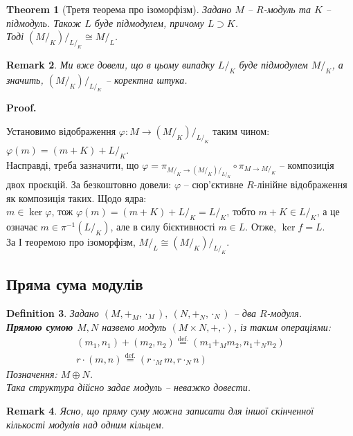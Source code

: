 \documentclass[a4paper, 10pt]{article}
\makeatletter
\theoremstyle{theoremdd}
\newtheorem{theorem}{Theorem}[subsection]
\theoremstyle{theoremdd}
\newtheorem{definition}[theorem]{Definition}
\theoremstyle{theoremdd}
\theoremstyle{theoremdd}
\theoremstyle{theoremdd}
\theoremstyle{theoremdd}
\theoremstyle{theoremdd}
\theoremstyle{theoremdd}
\theoremstyle{theoremdd}
\theoremstyle{theoremdd}
\theoremstyle{theoremdd}
\newtheorem{remark}[theorem]{Remark}
\theoremstyle{theoremdd}
\theoremstyle{theoremdd}
\theoremstyle{theoremdd}
\theoremstyle{theoremdd}
\renewenvironment{proof}[1][Proof.\\]{\par
\pushQED{\hfill \qed}%
\normalfont \topsep6\p@\@plus6\p@\relax
\trivlist
\item\relax
{\bfseries
#1\@addpunct{.}}\hspace\labelsep\ignorespaces
}{%
\popQED\endtrivlist\@endpefalse
}
\newcommand{\eqbydef}{\overset{\text{def.}}{=}}
\makeatother
\begin{document}
\begin{theorem}[Третя теорема про ізоморфізм]
Задано $M$ -- $R$-модуль та $K$ -- підмодуль. Також $L$ буде підмодулем, причому $L \supset K$.\\
Тоді $(M/_K)/_{L/_K} \cong M/_L$.
\end{theorem}

\begin{remark}
Ми вже довели, що в цьому випадку $L/_K$ буде підмодулем $M/_K$, а значить, $(M/_K)/_{L/_K}$ -- коректна штука.
\end{remark}

\begin{proof}
Установимо відображення $\varphi \colon M \to (M/_K)/_{L/_K}$ таким чином:\\
$\varphi(m) = (m+K) + L/_K$.\\
Насправді, треба зазначити, що $\varphi = \pi_{M/_K \to (M/_K)/_{L/_K}} \circ \pi_{M \to M/_K}$ -- композиція двох проєкцій. За безкоштовно довели: $\varphi$ -- сюр'єктивне $R$-лінійне відображення як композиція таких. Щодо ядра:\\
$m \in \ker \varphi$, тож $\varphi(m) = (m+K) + L/_K = L/_K$, тобто $m+K \in L/_K$, а це означає $m \in \pi^{-1}(L/_K)$, але в силу бієктивності  $m \in L$. Отже, $\ker f = L$.\\
За І теоремою про ізоморфізм, $M/_L \cong (M/_K)/_{L/_K}$. 
\end{proof}

\subsection{Пряма сума модулів}
\begin{definition}
Задано $(M,+_M,\cdot_M),\ (N,+_N,\cdot_N)$ -- два $R$-модуля.\\
\textbf{Прямою сумою $M,N$} назвемо модуль $(M \times N, +, \cdot)$, із таким операціями:
\begin{align*}
(m_1,n_1) + (m_2,n_2) \eqbydef (m_1 +_M m_2, n_1 +_N n_2) \\
r \cdot (m,n) \eqbydef (r \cdot_M m, r \cdot_N n)
\end{align*}
Позначення: $M \oplus N$.\\
\textit{Така структура дійсно задає модуль -- неважко довести.}
\end{definition}

\begin{remark}
Ясно, що пряму суму можна записати для іншої скінченної кількості модулів над одним кільцем.
\end{remark}
\end{document}
